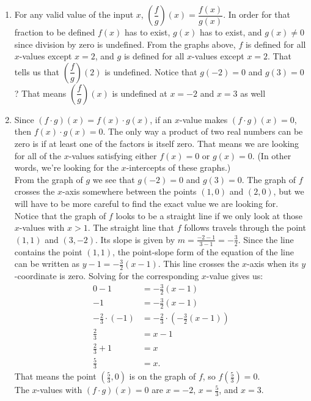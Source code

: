 \documentclass{ximera}
\begin{document}
\begin{example}
\begin{explanation}
\begin{enumerate}
				\item For any valid value of the input $x$,  $\left(\dfrac{f}{g}\right)(x) = \dfrac{f(x)}{g(x)}$. In order for that fraction to be defined
					$f(x)$ has to exist, $g(x)$ has to exist, and $g(x) \neq 0$ since division by zero is undefined. 
					From the graphs above, $f$ is defined for all $x$-values except $x=2$, and $g$ is defined for all $x$-values except $x=2$. That
					tells us that $\left( \dfrac{f}{g} \right)(2)$ is undefined. Notice that $g(-2)=0$ and $g(3)=0$? That means 
					$\left( \dfrac{f}{g}\right)(x)$ is undefined at $x=-2$ and $x=3$ as well
					
				\item Since $( f \cdot g)(x) = f(x) \cdot g(x)$, if an $x$-value makes $(f \cdot g)(x)=0$, then $f(x)\cdot g(x)= 0$. The only
					way a product of two real numbers can be zero is if at least one of the factors is itself zero. That means we are looking
					for all of the $x$-values satisfying either $f(x)=0$ or $g(x)=0$. (In other words, we're looking for the $x$-intercepts of 
					these graphs.)\\
					
					From the graph of $g$ we see that $g(-2)=0$ and $g(3)=0$. The graph of $f$ crosses the $x$-axis somewhere between the
					points $(1,0)$ and $(2,0)$, but we will have to be more careful to find the exact value we are looking for. \\
					
					Notice that the graph of $f$ looks to be a straight line if we only look at those $x$-values with $x>1$. The straight line that
					$f$ follows travels through the point $(1,1)$ and $(3, -2)$. Its slope is given by $m = \frac{-2 - 1}{3 - 1} = -\frac{3}{2}$. Since
					the line contains the point $(1,1)$, the point-slope form of the equation of the line can be written as $y-1 = -\frac{3}{2}(x-1)$.
					This line crosses the $x$-axis when its $y$-coordinate is zero. Solving for the corresponding $x$-value gives us:
					\begin{align*}
						0 - 1 &= -\frac{3}{2}(x-1)\\
						-1 &= -\frac{3}{2}(x-1)\\
						-\frac{2}{3} \cdot (-1) &= -\frac{2}{3} \cdot \left( -\frac{3}{2}(x-1) \right)\\
						\frac{2}{3} &= x-1\\
						\frac{2}{3} + 1 &= x\\
						\frac{5}{3} &= x.
					\end{align*}
					That means the point $\left( \frac{5}{3}, 0 \right)$ is on the graph of $f$, so $f\left( \frac{5}{3} \right) = 0$.\\
					
					The $x$-values with $(f \cdot g)(x) = 0$ are $x=-2$, $x=\frac{5}{3}$, and $x=3$.
			\end{enumerate}
		\end{explanation}	
	\end{example}
\end{document}
